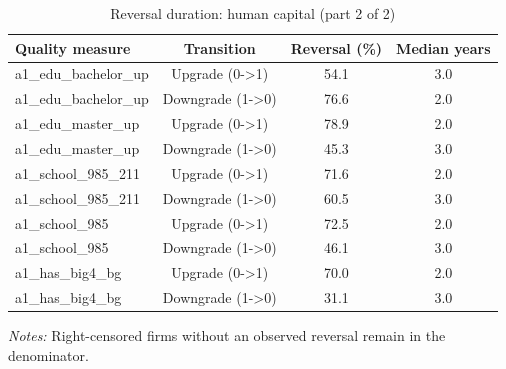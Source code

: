 \begin{table}[htbp]
\footnotesize
\centering
\caption{Reversal duration: human capital (part 2 of 2)}
\begin{threeparttable}
\begin{tabular}{p{}ccc}
\toprule
Quality measure & Transition & Reversal (\%) & Median years \\
\midrule
a1\_edu\_bachelor\_up & Upgrade (0->1) & 54.1 & 3.0 \\
a1\_edu\_bachelor\_up & Downgrade (1->0) & 76.6 & 2.0 \\
a1\_edu\_master\_up & Upgrade (0->1) & 78.9 & 2.0 \\
a1\_edu\_master\_up & Downgrade (1->0) & 45.3 & 3.0 \\
a1\_school\_985\_211 & Upgrade (0->1) & 71.6 & 2.0 \\
a1\_school\_985\_211 & Downgrade (1->0) & 60.5 & 3.0 \\
a1\_school\_985 & Upgrade (0->1) & 72.5 & 2.0 \\
a1\_school\_985 & Downgrade (1->0) & 46.1 & 3.0 \\
a1\_has\_big4\_bg & Upgrade (0->1) & 70.0 & 2.0 \\
a1\_has\_big4\_bg & Downgrade (1->0) & 31.1 & 3.0 \\
\bottomrule
\end{tabular}
\begin{tablenotes}\footnotesize
\item \raggedright \textit{Notes:} Right-censored firms without an observed reversal remain in the denominator.
\end{tablenotes}
\end{threeparttable}
\end{table}
